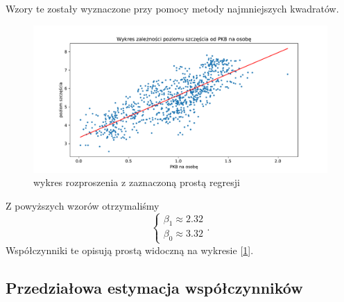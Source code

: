 \documentclass{article}
\theoremstyle{break}
\begin{document}
Wzory te zostały wyznaczone przy pomocy metody najmniejszych kwadratów.

\begin{figure}[H]
	\begin{center}
		\includegraphics[scale=0.43]{plot2.pdf}
		\caption{wykres rozproszenia z zaznaczoną prostą regresji}
		\label{fig:prosta}
	\end{center}
\end{figure}

Z powyższych wzorów otrzymaliśmy 
\begin{equation}
	\left\{ \begin{array}{ll}
		\beta_{1} \approx 2.32\\
		\beta_{0} \approx 3.32
	\end{array} \right..
\end{equation}
Współczynniki te opisują prostą widoczną na wykresie [\ref{fig:prosta}].

\subsection{Przedziałowa estymacja współczynników}
\end{document}
